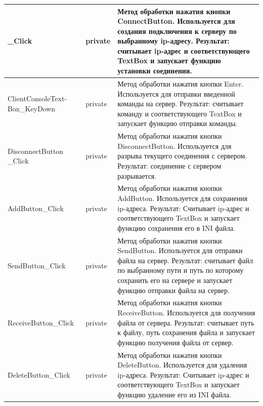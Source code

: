 \begin{longtable}[l]{|p{4.25cm}|p{2.35cm}|p{8.1cm}|}
	\_Click & private & Метод обработки нажатия кнопки ConnectButton. Используется для создания подключения к серверу по выбранному ip-адресу.
	Результат: считывает ip-адрес и соответствующего TextBox и запускает функцию установки соединения.\\
	\hline ClientConsoleText-
	Box\_KeyDown & private & Метод обработки нажатия кнопки Enter. Используется для отправки введенной команды на сервер.
	Результат: считывает команду и соответствующего TextBox и запускает функцию отправки команды.\\
	\hline DisconnectButton
	\_Click & private & Метод обработки нажатия кнопки DisconnectButton. Используется для разрыва текущего соединения с сервером.
	Результат: соединение с сервером разрывается.\\
	\hline AddButton\_Click & private & Метод обработки нажатия кнопки AddButton. Используется для сохранения ip-адреса.
	Результат: Считывает ip-адрес и соответствующего TextBox и запускает функцию сохранения его в INI файла.\\
	\hline SendButton\_Click & private &  Метод обработки нажатия кнопки SendButton. Используется для отправки файла на сервер.
	Результат: считывает файл по выбранному пути и путь по которому сохранить его на сервере и запускает функцию отправки файла на сервер.\\
	\hline ReceiveButton\_Click & private & Метод обработки нажатия кнопки ReceiveButton. Используется для получения файла от сервера.
	Результат: считывает путь к файлу, путь сохранения файла  и запускает функцию получения файла от сервер.\\
	\hline DeleteButton\_Click & private & Метод обработки нажатия кнопки DeleteButton. Используется для удаления ip-адреса.
	Результат: Считывает ip-адрес и соответствующего TextBox и запускает функцию удаление его из INI файла.
\end{longtable}
\vspace{-\tablebelowskip}

